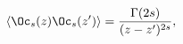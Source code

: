 \begin{equation}
\langle \Oc_s(z)\Oc_s(z')\rangle=\frac{\Gamma(2s)}{(z-z')^{2s}},
\label{OOcorf}
\end{equation}

